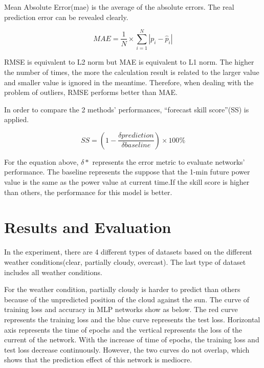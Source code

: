 Mean Absolute Error(mae) is the average of the absolute errors. The real prediction error can be revealed clearly.\cite{chai2014root}

\begin{equation}
	MAE=\frac{1}{N}\times \sum_{i=1}^{N}|p_{i}-\hat{p}_i|
\end{equation}

RMSE is equivalent to L2 norm but MAE is equivalent to L1 norm. 
The higher the number of times, the more the calculation result is related to the larger value and smaller value is ignored in the meantime. 
Therefore, when dealing with the problem of outliers, RMSE performs better than MAE.

In order to compare the 2 methods' performances, “forecast skill score”(SS) is applied.


\begin{equation}
	SS=(1-\frac{\delta prediction}{\delta  baseline})\times 100 \%
\end{equation}

For the equation above, $\delta*$ represents the error metric to evaluate networks' performance. The baseline represents the suppose that the 1-min future power value is the same as the power value at current time.If the skill score is higher than others, the performance for this model is better.




\chapter{Results and Evaluation}

In the experiment, there are 4 different types of datasets based on the different weather conditions(clear, partially cloudy, overcast). The last type of dataset includes all weather conditions.

For the weather condition, partially cloudy is harder to predict than others because of the unpredicted position of the cloud against the sun. The curve  of training loss and accuracy in  MLP networks show as below. The red curve represents the training loss and the blue curve  represents the test loss. Horizontal axis represents the time of epochs and the vertical represents the loss of the current of the network.
With the increase of time of epochs, the training loss and test loss decrease continuously. However, the two curves do not overlap, which shows that the prediction effect of this network is mediocre.

